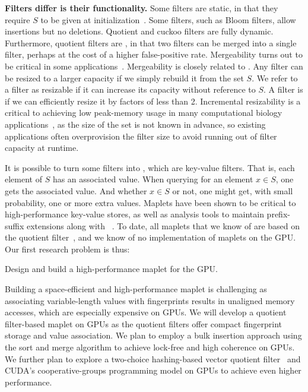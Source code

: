 \noindent
\textbf{Filters differ is their functionality.} Some filters are static, in that they require $S$ to be given at initialization~\cite{GrafLe20,DillingerW21}.  Some filters, such as Bloom filters, allow insertions but no deletions.  Quotient and cuckoo filters are fully dynamic.  Furthermore, quotient filters are , in that two filters can be merged into a single filter, perhaps at the cost of a higher false-positive rate.  Mergeability turns out to be critical in some applications~\cite{conway2020splinterdb,PandeyABFJP18Cell}. Mergeability is closely related to .  Any filter can be resized to a larger capacity if we  simply rebuild it from the set $S$.  We refer to a filter as resizable if it can increase its capacity without reference to $S$.  A filter is  if we can efficiently resize it by factors of less than 2.  Incremental resizability is a critical to achieving low peak-memory usage in many computational biology applications~\cite{hofmeyr2020terabase,PandeyBJP17,PandeyBJP17a,MarccaisKi11,wood2014kraken,wood2019improved}, as the size of the set is not known in advance, so existing applications often overprovision the filter size to avoid running out of filter capacity at runtime.


It is possible to turn some filters into , which are key-value filters.  That is, each element of $S$ has an associated value.  When querying for an element $x\in S$, one gets the associated value.  And whether $x\in S$ or not, one might get, with small probability, one or more extra values.  Maplets have been shown to be  critical to high-performance key-value stores, as well as \kmer analysis tools to maintain prefix-suffix extensions along with \kmers~\cite{GeorganasEHG18}.  To date, all maplets that we know of are based on the quotient filter~\cite{conway2020splinterdb,PandeyBJP17}, and we know of no implementation of maplets on the GPU\@.
%
Our first research problem is thus:

\begin{rproblem}
Design and build a high-performance maplet for the GPU\@.
\end{rproblem}

Building a space-efficient and high-performance maplet is challenging as associating variable-length values with fingerprints results in unaligned memory accesses, which are especially expensive on GPUs. We will develop a quotient filter-based maplet on GPUs as the quotient filters offer compact fingerprint storage and value association. We plan to employ a bulk insertion approach using the sort and merge algorithm to achieve lock-free and high coherence on GPUs. We further plan to explore a two-choice hashing-based vector quotient filter~\cite{PandeyCDBFJ21} and CUDA's cooperative-groups programming model on GPUs to achieve even higher performance.

